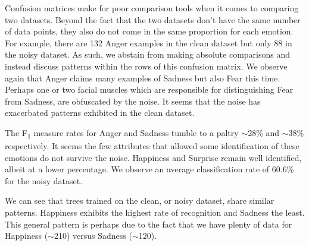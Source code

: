  

\newpage
Confusion matrices make for poor comparison tools when it comes to comparing two datasets.
Beyond the fact that the two datasets don't have the same number of data points,
they also do not come in the same proportion for each emotion. For example, there are 132 Anger examples in the clean dataset but only
88 in the noisy dataset. As such, we abstain from making absolute comparisons and instead discuss patterns within the rows
of this confusion matrix. We observe again that Anger claims many examples of Sadness but also Fear this time. Perhaps one or two facial
muscles which are responsible for distinguishing Fear from Sadness, are obfuscated by the noise.
It seems that the noise has exacerbated patterns exhibited in the clean dataset.



The F\textsubscript{1} measure rates for Anger and Sadness tumble to a paltry $\sim$28\% and $\sim$38\% respectively.
It seems the few attributes that allowed some identification of these emotions do not survive the noise.
Happiness and Surprise remain well identified, albeit at a lower percentage.
We observe an average classification rate of 60.6\% for the noisy dataset.


We can see that trees trained on the clean, or noisy dataset, share similar patterns.
Happiness exhibits the highest rate of recognition and Sadness the least.
This general pattern is perhaps due to the fact that we have plenty of data for Happiness ($\sim$210) versus Sadness ($\sim$120).



